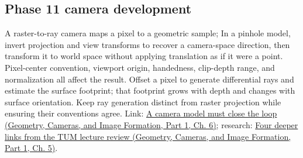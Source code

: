 \subsection{Phase 11 camera development}\label{appendix-1c07d64f5e70-phase-11-camera-development}

\hypertarget{appendix-1c07d64f5e70-phase-11-camera-development}{}

A raster-to-ray camera maps a pixel to a geometric sample; In a pinhole model, invert projection and view transforms to recover a camera-space direction, then transform it to world space without applying translation as if it were a point. Pixel-center convention, viewport origin, handedness, clip-depth range, and normalization all affect the result. Offset a pixel to generate differential rays and estimate the surface footprint; that footprint grows with depth and changes with surface orientation. Keep ray generation distinct from raster projection while ensuring their conventions agree. Link: \href{../03-Geometry-Cameras-and-Image-Formation-P01/main.pdf\#02-foundations-ii-ch037-a-camera-model-must-close-the-loop}{A camera model must close the loop (Geometry, Cameras, and Image Formation, Part 1, Ch. 6)}; research: \href{../03-Geometry-Cameras-and-Image-Formation-P01/main.pdf\#02-foundations-ii-ch036-four-deeper-links-from-the-tum-lecture-review}{Four deeper links from the TUM lecture review (Geometry, Cameras, and Image Formation, Part 1, Ch. 5)}.
